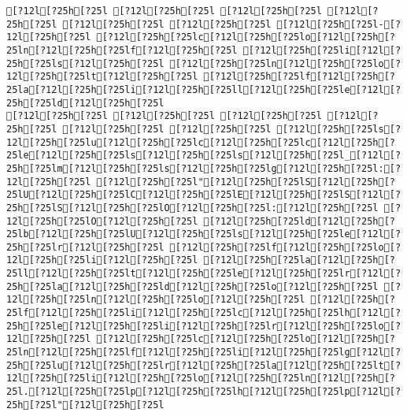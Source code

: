 \documentclass{scrartcl}
\begin{document}
\begin{Verbatim}
[?12l[?25h[?25l [?12l[?25h[?25l [?12l[?25h[?25l [?12l[?25h[?25l [?12l[?25h[?25l [?12l[?25h[?25l [?12l[?25h[?25l-[?12l[?25h[?25l [?12l[?25h[?25lc[?12l[?25h[?25lo[?12l[?25h[?25ln[?12l[?25h[?25lf[?12l[?25h[?25l [?12l[?25h[?25li[?12l[?25h[?25ls[?12l[?25h[?25l [?12l[?25h[?25ln[?12l[?25h[?25lo[?12l[?25h[?25lt[?12l[?25h[?25l [?12l[?25h[?25lf[?12l[?25h[?25la[?12l[?25h[?25li[?12l[?25h[?25ll[?12l[?25h[?25le[?12l[?25h[?25ld[?12l[?25h[?25l
[?12l[?25h[?25l [?12l[?25h[?25l [?12l[?25h[?25l [?12l[?25h[?25l [?12l[?25h[?25l [?12l[?25h[?25l [?12l[?25h[?25ls[?12l[?25h[?25lu[?12l[?25h[?25lc[?12l[?25h[?25lc[?12l[?25h[?25le[?12l[?25h[?25ls[?12l[?25h[?25ls[?12l[?25h[?25l_[?12l[?25h[?25lm[?12l[?25h[?25ls[?12l[?25h[?25lg[?12l[?25h[?25l:[?12l[?25h[?25l [?12l[?25h[?25l"[?12l[?25h[?25lS[?12l[?25h[?25lU[?12l[?25h[?25lC[?12l[?25h[?25lE[?12l[?25h[?25lS[?12l[?25h[?25lS[?12l[?25h[?25lO[?12l[?25h[?25l:[?12l[?25h[?25l [?12l[?25h[?25lO[?12l[?25h[?25l [?12l[?25h[?25ld[?12l[?25h[?25lb[?12l[?25h[?25lU[?12l[?25h[?25ls[?12l[?25h[?25le[?12l[?25h[?25lr[?12l[?25h[?25l [?12l[?25h[?25lf[?12l[?25h[?25lo[?12l[?25h[?25li[?12l[?25h[?25l [?12l[?25h[?25la[?12l[?25h[?25ll[?12l[?25h[?25lt[?12l[?25h[?25le[?12l[?25h[?25lr[?12l[?25h[?25la[?12l[?25h[?25ld[?12l[?25h[?25lo[?12l[?25h[?25l [?12l[?25h[?25ln[?12l[?25h[?25lo[?12l[?25h[?25l [?12l[?25h[?25lf[?12l[?25h[?25li[?12l[?25h[?25lc[?12l[?25h[?25lh[?12l[?25h[?25le[?12l[?25h[?25li[?12l[?25h[?25lr[?12l[?25h[?25lo[?12l[?25h[?25l [?12l[?25h[?25lc[?12l[?25h[?25lo[?12l[?25h[?25ln[?12l[?25h[?25lf[?12l[?25h[?25li[?12l[?25h[?25lg[?12l[?25h[?25lu[?12l[?25h[?25lr[?12l[?25h[?25la[?12l[?25h[?25lt[?12l[?25h[?25li[?12l[?25h[?25lo[?12l[?25h[?25ln[?12l[?25h[?25l.[?12l[?25h[?25lp[?12l[?25h[?25lh[?12l[?25h[?25lp[?12l[?25h[?25l"[?12l[?25h[?25l

\end{Verbatim}
\end{document}

